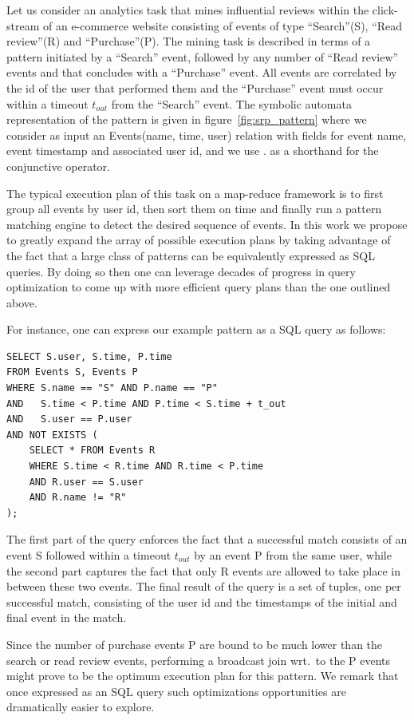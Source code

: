 Let us consider an analytics task that mines influential reviews
within the click-stream of an e-commerce website consisting of events of type
``Search''(S), ``Read review''(R) and ``Purchase''(P).
The mining task is described in terms of a pattern initiated by a ``Search''
event, followed by any number of ``Read review'' events and that concludes with
a ``Purchase'' event. 
All events are correlated by the id of the user that performed them and the
``Purchase'' event must occur within a timeout $t_{out}$ from the ``Search'' event. 
The symbolic automata representation of the pattern is given in
figure~\ref{fig:srp_pattern} where we consider as input an Events(name, time,
user) relation with fields for event name, event timestamp and
associated user id, and we use $.$ as a shorthand for the conjunctive operator.

The typical execution plan of this task on a map-reduce framework is to first
group all events by user id, then sort them on time and finally run a pattern
matching engine to detect the desired sequence of events.
In this work we propose to greatly expand the array of possible execution plans
by taking advantage of the fact that a large class of patterns can be
equivalently expressed as SQL queries.
By doing so then one can leverage decades of progress in query optimization to
come up with more efficient query plans than the one outlined above.

For instance, one can express our example pattern as a SQL query as follows:
\begin{verbatim}
SELECT S.user, S.time, P.time
FROM Events S, Events P
WHERE S.name == "S" AND P.name == "P"  
AND   S.time < P.time AND P.time < S.time + t_out
AND   S.user == P.user
AND NOT EXISTS ( 
    SELECT * FROM Events R
    WHERE S.time < R.time AND R.time < P.time
    AND R.user == S.user
    AND R.name != "R"
); 
\end{verbatim}

The first part of the query enforces the fact that a successful match consists
of an event S followed within a timeout $t_{out}$ by an event P from the same user,
while the second part captures the fact that only R events are allowed to take
place in between these two events.
The final result of the query is a set of tuples, one per successful match,
consisting of the user id and the timestamps of the initial and final event
in the match.

Since the number of purchase events P are bound to be much lower than the
search or read review events, performing a broadcast join wrt.\ to the P events
might prove to be the optimum execution plan for this pattern. We remark that
once expressed as an SQL query such optimizations opportunities are dramatically
easier to explore.



